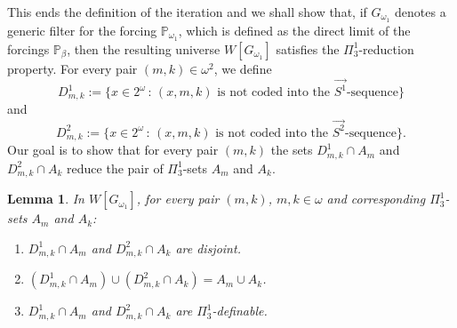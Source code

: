 \documentclass[a4paper,11pt]{article}
\newtheorem{lemma}[theorem]{Lemma}
\newcommand{\forceP}{\mathbb{P}}
\begin{document}
This ends the definition of the iteration and we shall show that, if $G_{\omega_1}$ denotes a generic filter for the forcing $\forceP_{\omega_1}$, which is defined as the direct limit of the forcings $\forceP_{\beta}$, then the resulting universe $W[G_{\omega_1}]$ satisfies the $\Pi^1_3$-reduction property.
For every pair $(m,k) \in \omega^2$, we define 
\[D^1_{m,k}:= \{ x \in 2^{\omega} \, : \, (x,m,k)\text{ is  not coded into the } \vec{S^1}\text{-sequence}\}\]
and 
\[D^2_{m,k}:= \{ x \in 2^{\omega} \, : \,(x,m,k) \text{ is not coded into the } \vec{S^2}\text{-sequence}\}.\]
Our goal is to show that for every pair $(m,k)$ the sets $D^1_{m,k} \cap A_m$ and $D^2_{m,k} \cap A_k$ reduce the pair of $\Pi^1_3$-sets $A_m$ and $A_k$. 

\begin{lemma}
In $W[G_{\omega_1}]$, for every pair $(m,k)$, $m,k \in \omega$ and corresponding $\Pi^1_3$-sets $A_m$ and $A_k$:
\begin{enumerate}


\item[(a)] $D^1_{m,k} \cap A_m$ and $D^2_{m,k} \cap A_k$ are disjoint.
\item[(b)] $(D^1_{m,k} \cap A_m) \cup (D^2_{m,k} \cap A_k)= A_m \cup A_k$.
\item[(c)] $D^1_{m,k} \cap A_m$ and $D^2_{m,k} \cap A_k$ are $\Pi^1_3$-definable.
\end{enumerate}
\end{lemma}
\end{document}
